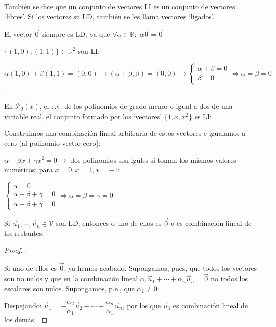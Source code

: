 También se dice que un conjunto de vectores LI es un conjunto de vectores `libres'. Si los vectores sn LD, también se les llama vectores `ligados'.

\begin{ejem}
El vector $\vec 0$ siempre es LD, ya que $\forall \alpha \in \mathbb R:\; \alpha \vec 0 = \vec 0$	
\end{ejem}

\begin{ejem}
$\{(1,0), (1,1)\} \subset \mathbb R^2$ son LI:

\noindent \small{$\alpha (1,0) + \beta (1,1) = (0,0) \to (\alpha+\beta, \beta)=(0,0) \to \begin{cases} \alpha + \beta =0\\ \beta=0 \end{cases} \Rightarrow \alpha=\beta=0$	}\normalsize{.}
\end{ejem}

\begin{ejem}
En $\mathcal P_2(x)$, el e.v. de los polinomios de grado menor o igual a dos de una variable real, el conjunto formado por los `vectores' $\{ 1,x,x^2 \}$ es LI:

Construimos una combinación lineal arbitraria de estos vectores e igualamos a cero (al polinomio-vector cero):	

$\alpha + \beta x + \gamma x^2 =0 \to $ dos polinomios son igules si toman los mismos valores numéricos; para $x=0, x=1, x=-1:$

$\begin{cases} \alpha=0\\ \alpha+\beta+\gamma=0 \\ \alpha+\beta+\gamma=0 \end{cases} \Rightarrow \alpha=\beta=\gamma=0$

\end{ejem}


\begin{prop}
	Si $\vec u_1, \cdots, \vec u_n \in \mathcal V$ son LD, entonces o uno de ellos es $\vec 0$ o es combinación lineal de los restantes.
\end{prop}

\begin{proof}.

\noindent \textcolor{gris}{Si uno de ellos es $\vec 0$, ya hemos acabado. Supongamos, pues, que todos los vectores son no nulos y que en la combinación lineal  $\alpha_1 \vec u_1 + \cdots + \alpha_n \vec u_n=\vec 0$ no todos los escalares son nulos. Supongamos, p.e., que $\alpha_1 \neq 0$:  } 

\noindent \textcolor{gris}{ Despejando: $\vec u_1=-\dfrac{\alpha_2}{\alpha_1}\vec u_2 - \cdots -\dfrac{\alpha_n}{\alpha_1}\vec u_n$, por los que $\vec u_1$ es combinación lineal de los demás.   }
	
\end{proof}

